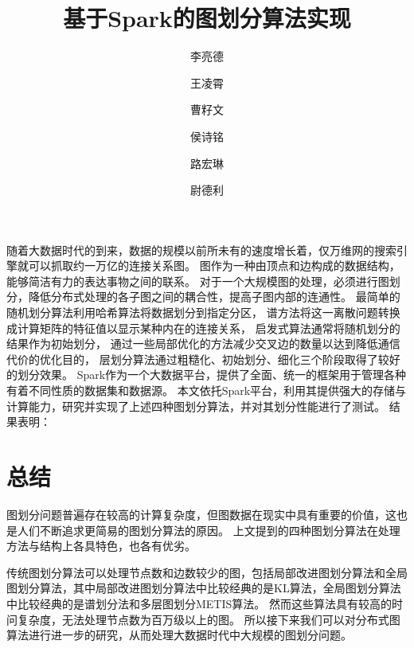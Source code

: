 \documentclass[UTF8,12pt]{ctexart} %
\theoremstyle{definition}
\begin{document}
\title{基于Spark的图划分算法实现}
\author[1]{李亮德}
\author[1]{王凌霄}
\author[2]{曹籽文}
\author[2]{侯诗铭}
\author[2]{路宏琳}
\author[3]{尉德利}
\renewcommand\Authands{, }

\maketitle

\renewcommand{\abstractname}{}
\begin{onecolabstract}
    随着大数据时代的到来，数据的规模以前所未有的速度增长着，仅万维网的搜索引擎就可以抓取约一万亿的连接关系图。
    图作为一种由顶点和边构成的数据结构，能够简洁有力的表达事物之间的联系。
    对于一个大规模图的处理，必须进行图划分，降低分布式处理的各子图之间的耦合性，提高子图内部的连通性。
    最简单的随机划分算法利用哈希算法将数据划分到指定分区，
    谱方法将这一离散问题转换成计算矩阵的特征值以显示某种内在的连接关系，
    启发式算法通常将随机划分的结果作为初始划分，
    通过一些局部优化的方法减少交叉边的数量以达到降低通信代价的优化目的，
    层划分算法通过粗糙化、初始划分、细化三个阶段取得了较好的划分效果。
    Spark作为一个大数据平台，提供了全面、统一的框架用于管理各种有着不同性质的数据集和数据源。
    本文依托Spark平台，利用其提供强大的存储与计算能力，研究并实现了上述四种图划分算法，并对其划分性能进行了测试。
    结果表明：
\end{onecolabstract}

\newpage
\tableofcontents
\newpage




% 

\section{总结}

图划分问题普遍存在较高的计算复杂度，但图数据在现实中具有重要的价值，这也是人们不断追求更简易的图划分算法的原因。
上文提到的四种图划分算法在处理方法与结构上各具特色，也各有优劣。

传统图划分算法可以处理节点数和边数较少的图，包括局部改进图划分算法和全局图划分算法，其中局部改进图划分算法中比较经典的是KL算法，全局图划分算法中比较经典的是谱划分法和多层图划分METIS算法。
然而这些算法具有较高的时问复杂度，无法处理节点数为百万级以上的图。
所以接下来我们可以对分布式图算法进行进一步的研究，从而处理大数据时代中大规模的图划分问题。
\end{document}
